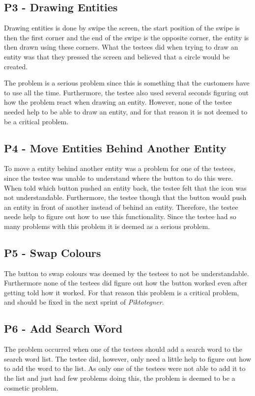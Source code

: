 \subsection*{P3 - Drawing Entities}
Drawing entities is done by swipe the screen, the start position of the swipe is then the first corner and the end of the swipe is the opposite corner, the entity is then drawn using these corners.
What the testees did when trying to draw an entity was that they pressed the screen and believed that a circle would be created.

The problem is a serious problem since this is something that the customers have to use all the time.
Furthermore, the testee also used several seconds figuring out how the problem react when drawing an entity.
However, none of the testee needed help to be able to draw an entity, and for that reason it is not deemed to be a critical problem.

\subsection*{P4 - Move Entities Behind Another Entity}
To move a entity behind another entity was a problem for one of the testees, since the testee was unable to understand where the button to do this were.
When told which button pushed an entity back, the testee felt that the icon was not understandable.
Furthermore, the testee though that the button would push an entity in front of another instead of behind an entity.
Therefore, the testee neede help to figure out how to use this functionality.
Since the testee had so many problems with this problem it is deemed as a serious problem.

\subsection*{P5 - Swap Colours}
The button to swap colours was deemed by the testees to not be understandable.
Furthermore none of the testees did figure out how the button worked even after getting told how it worked.
For that reason this problem is a critical problem, and should be fixed in the next sprint of \textit{Piktotegner}.

\subsection*{P6 - Add Search Word}
The problem occurred when one of the testees should add a search word to the search word list.
The testee did, however, only need a little help to figure out how to add the word to the list.
As only one of the testees were not able to add it to the list and just had few problems doing this, the problem is deemed to be a cosmetic problem.


